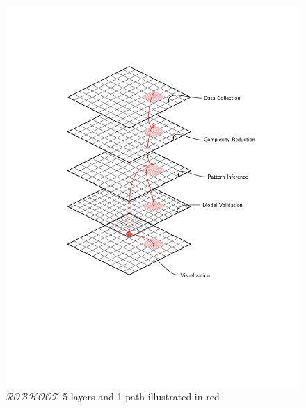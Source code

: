 \documentclass[english,12pt]{article}
\begin{document}
\begin{figure}
  \begin{center}
\hspace{-0.5 in}\includegraphics[scale=0.8]{Figure2b.pdf}
\end{center}
\vspace{-2 in}
\caption{$\mathcal{ROBHOOT}$ 5-layers and 1-path illustrated in red}
\label{}
\end{figure}
\newpage




\printindex
\end{document}

